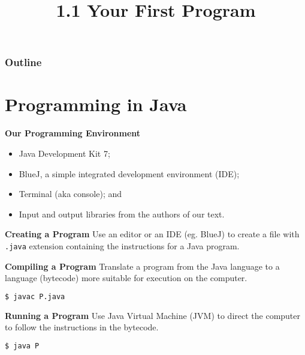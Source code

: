 \documentclass[8pt,a4paper,compress]{beamer}
\title{1.1 Your First Program}
\date{}
\begin{document}
\begin{frame}
\vfill
\titlepage
\end{frame}

\begin{frame}
\frametitle{Outline}
\tableofcontents
\end{frame}

\section{Programming in Java}
\begin{frame}[fragile]

\pause

\textbf{Our Programming Environment}
\begin{itemize}
\item Java Development Kit 7;  
\item BlueJ, a simple integrated development environment (IDE);
\item Terminal (aka console); and
\item Input and output libraries from the authors of our text. 
\end{itemize}

\pause
\smallskip

\textbf{Creating a Program} Use an editor or an IDE (eg. BlueJ) to create a file with \texttt{.java} extension containing the instructions for a Java program. 

\pause
\smallskip

\textbf{Compiling a Program} Translate a program from the Java language to a language (bytecode) more suitable for execution on the computer.

\begin{lstlisting}[language=bash]
$ javac P.java
\end{lstlisting}

\pause
\smallskip

\textbf{Running a Program} Use Java Virtual Machine (JVM) to direct the computer to follow the instructions in the bytecode.

\begin{lstlisting}[language=bash]
$ java P
\end{lstlisting}

\pause
\smallskip


\end{frame}
\end{document}
